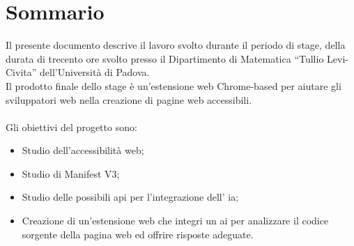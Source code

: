 \cleardoublepage
{}
{}
\begingroup
\let\clearpage\relax
\let\cleardoublepage\relax
\chapter*{Sommario}

\noindent Il presente documento descrive il lavoro svolto durante il periodo di stage, della durata di trecento ore svolto presso il Dipartimento di Matematica “Tullio Levi-Civita” dell’Università di Padova. \\
Il prodotto finale dello stage è un'estensione web Chrome-based per aiutare gli sviluppatori web nella creazione di pagine web accessibili.\\
\\
Gli obiettivi del progetto sono:
\begin{itemize}
    \item Studio dell'accessibilità web;
    \item Studio di Manifest V3;
    \item Studio delle possibili \acrshort{api} per l'integrazione dell' \acrshort{ia};
    \item Creazione di un'estensione web che integri un  \acrshort{ai} per analizzare il codice sorgente della pagina web ed offrire risposte adeguate.
\end{itemize}

\endgroup
\vfill